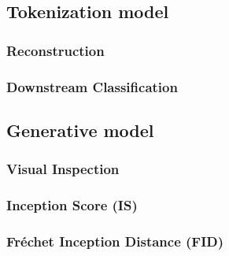 \documentclass[../../thesis.tex]{subfiles}
\begin{document}
\subsection{Tokenization model}

\subsubsection{Reconstruction}

\subsubsection{Downstream Classification}




\subsection{Generative model}

\subsubsection{Visual Inspection}

\subsubsection{Inception Score (IS)}

\subsubsection{Fréchet Inception Distance (FID)}
\end{document}
